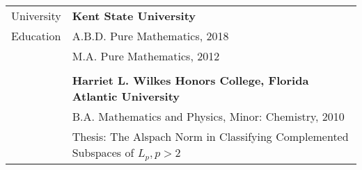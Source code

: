 \documentclass[letterpaper,10pt,oneside]{article}
\begin{document}
\vspace{0.1in}

\noindent \begin{tabular}{@{} l l}
 \Large{University} & \textbf{Kent State University} \\
 \Large{Education} & A.B.D. Pure Mathematics, 2018 \\
 \hspace{1.1in} & M.A. Pure Mathematics, 2012 \\
 & \\
 & \textbf{Harriet L. Wilkes Honors College, Florida Atlantic University} \\
 & B.A. Mathematics and Physics, Minor: Chemistry, 2010 \\
 & Thesis: The Alspach Norm in Classifying Complemented Subspaces of $L_p, p>2$ \\
\end{tabular}

\vfill
\end{document}

